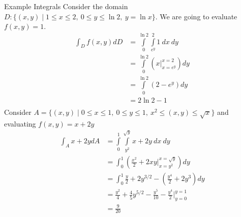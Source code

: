 \documentclass[8pt]{extarticle}
\begin{document}
  \begin{problem}{Example Integrals}
    Consider the domain $D: \{(x,y)\mid 1\leq x \leq 2,~0\leq y\leq \ln 2,~y = \ln x\}$. We are going to evaluate $f(x,y) = 1$.
    \begin{align*}
      \int_{D}f(x,y) dD &= \int\limits_{0}^{\ln 2}\int\limits_{e^y}^{2} 1 ~dx~dy\\
                     &= \int\limits_{0}^{\ln 2}\left(x\biggr\vert_{x=e^y}^{x=2}\right)dy\\
                     &= \int\limits_{0}^{\ln 2} (2 - e^y) dy\\
                     &= 2\ln 2 - 1\\
    \end{align*}
    Consider $A = \{(x,y)\mid 0\leq x \leq 1,~0\leq y \leq 1,~x^2\leq (x,y)\leq \sqrt{x}\}$ and evaluating $f(x,y) = x + 2y$
      \begin{align*}
        \int_{A} x + 2y dA &= \int\limits_{0}^{1}\int\limits_{y^2}^{\sqrt{y}} x + 2y~dx~dy\\
                           &= \int_{0}^{1}\left(\frac{x^2}{2}+2xy\biggr\vert_{x=y^2}^{x=\sqrt{y}}\right)dy\\
                           &= \int_{0}^{1}\frac{y}{2}+2y^{3/2}-\left(\frac{y^4}{2} + 2y^3\right)dy\\
                           &= \frac{y^2}{4} + \frac{4}{5}y^{5/2} - \frac{y^5}{10} - \frac{y^4}{2}\Biggr\vert_{y=0}^{y=1}\\
                           &= \frac{9}{20}
      \end{align*}
  \end{problem}
\end{document}
